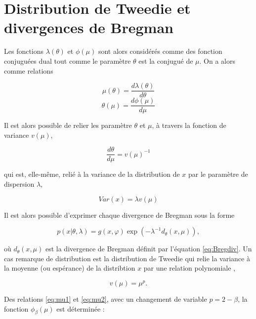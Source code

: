 \chapter{Distribution de Tweedie et divergences de Bregman}


Les fonctions $\lambda(\theta)$ et $\phi(\mu)$ sont alors considérés comme des fonction conjuguées dual tout comme le paramètre $\theta$ est la conjugué de $\mu$. On a alors comme relations

\begin{equation}\label{eq:mu1}
\mu(\theta) = \frac{d\lambda(\theta)}{d\theta}
\end{equation}
\begin{equation}\label{eq:mu2}
\theta(\mu) = \frac{d\phi(\mu)}{d\mu}
\end{equation}

Il est alors possible de relier les paramètre $\theta$ et $\mu$, à travers la fonction de variance $v(\mu)$, 

\begin{equation}
\frac{d\theta}{d\mu} = v(\mu)^{-1}
\end{equation}

qui est, elle-même, relié à la variance de la distribution de $x$ par le paramètre de dispersion $\lambda$, 

\begin{equation}
Var(x) = \lambda v(\mu)
\end{equation}

Il est alors possible d'exprimer chaque divergence de Bregman sous la forme 

\begin{equation} \label{eq:g_exp}
p\left(x\vert \theta,\lambda\right) = g(x,\varphi) \exp\left(-\lambda^{-1} d_{\theta}(x,\mu) \right), 
\end{equation}

où $d_{\theta}(x,\mu)$ est la divergence de Bregman définit par l'équation \ref{eq:Bregdiv}. Un cas remarque de distribution est la distribution de Tweedie \cite{jorgensen_exponential_1987} qui relie la variance à la moyenne (ou espérance) de la distribtion $x$ par une relation polynomiale \cite{yilmaz_alpha/beta_2012}, 

\begin{equation}
v(\mu) = \mu^{p}.
\end{equation}

Des relations \ref{eq:mu1} et \ref{eq:mu2}, avec un changement de variable $p = 2-\beta$, la fonction $\phi_{\beta}(\mu)$ est déterminée : 

